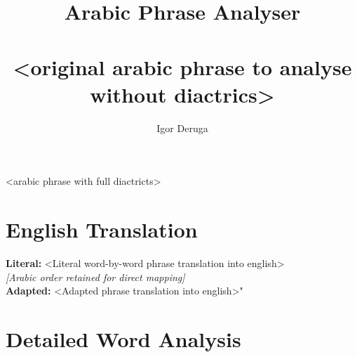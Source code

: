\documentclass[letterpaper,12pt]{article}
\begin{document}
\title{\textbf{\Large Arabic Phrase Analyser}\\
\\
\normalsize \textarabic{<original arabic phrase to analyse without diactrics>}}
\author{Igor Deruga}
\date{}
\maketitle

\begin{tcolorbox}[colback=boxcolor,colframe=headercolor,title=\textbf{Arabic Phrase with Full Diactrics},breakable]
\centering
\textarabic{<arabic phrase with full diactricts>}
\end{tcolorbox}

\section{English Translation}
\begin{tcolorbox}[colback=white,colframe=accentcolor,breakable]
\textbf{Literal:} <Literal word-by-word phrase translation into english> \\
\textit{[Arabic order retained for direct mapping]}\\[0.5em]
\textbf{Adapted:} <Adapted phrase translation into english>"
\end{tcolorbox}

\section{Detailed Word Analysis}
\end{document}
